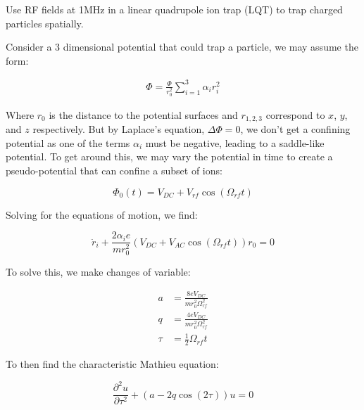 Use RF fields at 1MHz in a linear quadrupole ion trap (LQT) to trap charged particles spatially.\cite{Wolfgang1990}

Consider a 3 dimensional potential that could trap a particle, we may assume the form:

\begin{align*}
	\Phi = \frac{\Phi}{r_0^2} \sum_{i=1}^3 \alpha_i r_i^2
\end{align*}

Where $r_0$ is the distance to the potential surfaces and $r_{1,2,3}$ correspond to $x$, $y$, and $z$ respectively. But by Laplace's equation, $\Delta \Phi = 0$, we don't get a confining potential as one of the terms $\alpha_i$ must be negative, leading to a saddle-like potential. To get around this, we may vary the potential in time to create a pseudo-potential that can confine a subset of ions:

\begin{equation*}
	\Phi_0(t) = V_{DC} + V_{rf} \cos(\Omega_{rf} t)
\end{equation*}

Solving for the equations of motion, we find:

\begin{equation}
	\ddot{r}_i + \frac{2 \alpha_i e}{m r_0^2}(V_{DC} + V_{AC} \cos(\Omega_{rf} t))r_0 = 0
\end{equation}

To solve this, we make changes of variable:

\begin{align}
	a & = \frac{8eV_{DC}}{mr_0^2\Omega_{rf}^2} \label{eq: a param} \\
	q & = \frac{4eV_{DC}}{mr_0^2\Omega_{rf}^2} \label{eq: q param} \\
	\tau & = \frac{1}{2}\Omega_{rf} t \nonumber
\end{align}

To then find the characteristic Mathieu equation:

\begin{equation}
	\frac{\partial^2 u}{\partial \tau^2} + (a - 2q \cos(2 \tau))u = 0
	\label{eq: Mathieu diffeq}
\end{equation}

%
%

